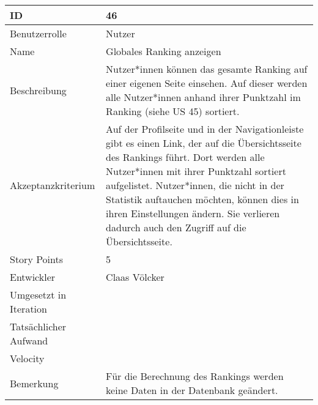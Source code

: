 \begin{tabularx}{\textwidth}{|p{}|X|}
	\hline
	ID & 46\\
	\hline
	Benutzerrolle & Nutzer\\
	\hline
	Name & Globales Ranking anzeigen\\
	\hline
	Beschreibung & Nutzer*innen können das gesamte Ranking auf einer eigenen Seite einsehen. Auf dieser werden alle Nutzer*innen anhand ihrer Punktzahl im Ranking (siehe US 45) sortiert.\\
	\hline
	Akzeptanzkriterium & Auf der Profilseite und in der Navigationleiste gibt es einen Link, der auf die Übersichtsseite des Rankings führt. Dort werden alle Nutzer*innen mit ihrer Punktzahl sortiert aufgelistet. Nutzer*innen, die nicht in der Statistik auftauchen möchten, können dies in ihren Einstellungen ändern. Sie verlieren dadurch auch den Zugriff auf die Übersichtsseite.\\
	\hline
	Story Points & 5\\
	\hline
	Entwickler & Claas Völcker\\
	\hline
	Umgesetzt in Iteration & \\ 
	\hline
	Tatsächlicher Aufwand & \\
	\hline
	Velocity & \\
	\hline
	Bemerkung & Für die Berechnung des Rankings werden keine Daten in der Datenbank geändert.\\
	\hline
\end{tabularx}
\vspace{20pt}
